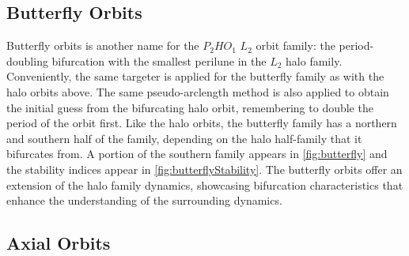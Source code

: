 \subsection{Butterfly Orbits}
Butterfly orbits is another name for the $P_{2}HO_{1}$ $L_{2}$ orbit family: the period-doubling
bifurcation with the smallest perilune in the $L_{2}$ halo family\cite{ZimovanSpreen:2021}.
Conveniently, the same targeter is applied for the butterfly family as with the halo orbits above. The
same pseudo-arclength method is also applied to obtain the initial guess from the bifurcating halo
orbit, remembering to double the period of the orbit first. Like the halo orbits, the butterfly
family has a northern and southern half of the family, depending on the halo half-family that it
bifurcates from. A portion of the southern family appears in \cref{fig:butterfly} and the
stability indices appear in \cref{fig:butterflyStability}. The butterfly orbits offer an
extension of the halo family dynamics, showcasing bifurcation characteristics that enhance the
understanding of the surrounding dynamics.

\subsection{Axial Orbits}
